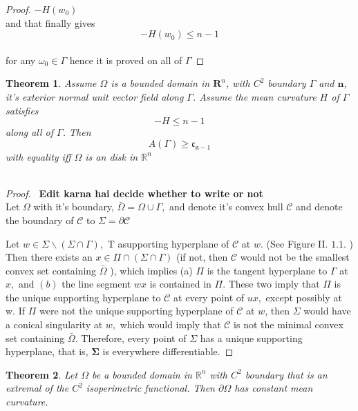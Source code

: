 \documentclass[oneside]{book}
\newtheorem{theorem}{Theorem}[section]
\begin{document}
\begin{proof}
$ -H\left(w_{0}\right )$ \\

  and that finally gives
  \\
   $$ -H(w_{0})\leq n-1 $$ \\
    for any $ \omega_{0} \in \Gamma$ hence it is proved on all of $\Gamma$ 
\end{proof}





\begin{theorem}
\label{t:5}
Assume $\Omega$ is a bounded domain in $\mathbf{R}^{n}$, with $C^{2}$ boundary $\Gamma$
and $\mathbf{n}$, it's exterior normal unit vector field along $\Gamma$. Assume the mean curvature
$H$ of $\Gamma$ satisfies
$$
-H \leq n-1
$$
along all of $\Gamma$. Then
$$
A(\Gamma) \geq \mathfrak{c}_{\mathfrak{n}-1}
$$
with equality iff $\Omega$ is an disk in $\mathbb{R}^{n}$ \\\\
\end{theorem}

\begin{proof} \ \textbf{Edit karna hai decide whether to write or not }\\

 Let $\Omega$ with it's boundary,  $\bar{\Omega} =\Omega \cup \Gamma,$ and denote it's convex hull  $\mathcal{C}$  and denote the boundary of $\mathcal{C}$  to $\Sigma=\partial \mathcal{C}$ 

Let $w \in \Sigma \backslash(\Sigma \cap \Gamma),$ T asupporting hyperplane of $\mathcal{C}$ at $w$. (See Figure II. $1.1 .$ ) Then there exists an $x \in \Pi \cap(\Sigma \cap \Gamma)$ (if not, then $\mathcal{C}$ would not be the smallest convex set containing $\bar{\Omega}$ ), which implies (a) $\Pi$ is the tangent hyperplane to $\Gamma$
at $x,$ and $(b)$ the line segment $w x$ is contained in $\Pi$. These two imply that $\Pi$ is the unique supporting hyperplane to $\mathcal{C}$ at every point of $u x,$ except possibly at
w. If $\Pi$ were not the unique supporting hyperplane of $\mathcal{C}$ at $w$, then $\Sigma$ would have a conical singularity at $w,$ which would imply that $\mathcal{C}$ is not the minimal convex set containing $\bar{\Omega}$. Therefore, every point of $\Sigma$ has a unique supporting hyperplane, that is, $\boldsymbol{\Sigma}$ is everywhere differentiable.
\end{proof}


\begin{theorem}
\label{t:5.5}
 Let $\Omega$ be a bounded domain in $\mathbb{R}^{n}$ with $C^{2}$ boundary that is an extremal of the $C^{2}$ isoperimetric functional. Then  $\partial \Omega$ has constant mean curvature.
\end{theorem}
\end{document}
